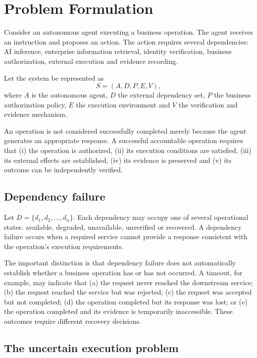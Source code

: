 \documentclass[11pt,a4paper]{article}
\begin{document}
\section{Problem Formulation}

Consider an autonomous agent executing a business operation. The agent receives an instruction and proposes an action. The action requires several dependencies: AI inference, enterprise information retrieval, identity verification, business authorization, external execution and evidence recording.

Let the system be represented as
\[
S = (A, D, P, E, V),
\]
where $A$ is the autonomous agent, $D$ the external dependency set, $P$ the business authorization policy, $E$ the execution environment and $V$ the verification and evidence mechanism.

An operation is not considered successfully completed merely because the agent generates an appropriate response. A successful accountable operation requires that (i) the operation is authorized, (ii) its execution conditions are satisfied, (iii) its external effects are established, (iv) its evidence is preserved and (v) its outcome can be independently verified.

\subsection{Dependency failure}

Let $D = \{d_1, d_2, \ldots, d_n\}$. Each dependency may occupy one of several operational states: available, degraded, unavailable, unverified or recovered. A dependency failure occurs when a required service cannot provide a response consistent with the operation's execution requirements.

The important distinction is that dependency failure does not automatically establish whether a business operation has or has not occurred. A timeout, for example, may indicate that (a) the request never reached the downstream service; (b) the request reached the service but was rejected; (c) the request was accepted but not completed; (d) the operation completed but its response was lost; or (e) the operation completed and its evidence is temporarily inaccessible. These outcomes require different recovery decisions.

\subsection{The uncertain execution problem}
\end{document}
